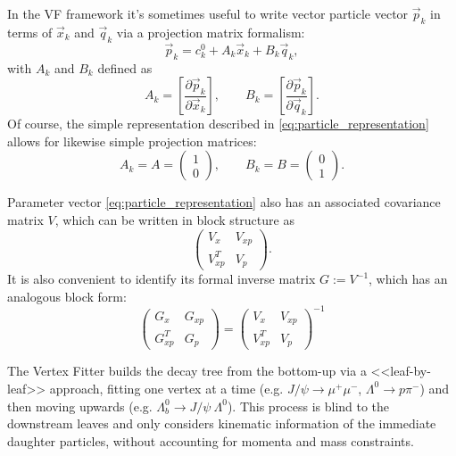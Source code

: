 In the VF framework it's sometimes useful to write vector particle vector $\vec{p}_k$ in terms of $\vec{x}_k$ and $\vec{q}_k$ via a projection matrix formalism:
\begin{equation}
	\vec{p}_k = c^0_k + A_k \vec{x}_k + B_k \vec{q}_k,
\end{equation}
with $A_k$ and $B_k$ defined as
\begin{equation}
A_k = \left[
	\frac{\partial \vec{p}_k}{\partial \vec{x}_k}
\right],
\quad\quad 
B_k = \left[
	\frac{\partial \vec{p}_k}{\partial \vec{q}_k}
\right].
\end{equation}
Of course, the simple representation described in \eqref{eq:particle_representation} allows for likewise simple projection matrices:
\begin{equation}
A_k = A = \begin{pmatrix}
1 \\
0
\end{pmatrix},
\quad\quad 
B_k = B = \begin{pmatrix}
0 \\
1
\end{pmatrix}.
\end{equation}

Parameter vector \eqref{eq:particle_representation} also has an associated covariance matrix $V$, which can be written in block structure as
\begin{equation}
	\begin{pmatrix}
		V_x      & V_{xp} \\
		V_{xp}^T & V_p
	\end{pmatrix}.
\end{equation}
It is also convenient to identify its formal inverse matrix $G := V^{-1}$, which has an analogous block form:
\begin{equation}
	\begin{pmatrix}
		G_x      & G_{xp} \\
		G_{xp}^T & G_p
	\end{pmatrix}
	=
	\begin{pmatrix}
		V_x      & V_{xp} \\
		V_{xp}^T & V_p
	\end{pmatrix}^{-1}
\end{equation}

The Vertex Fitter builds the decay tree from the bottom-up via a <<leaf-by-leaf>> approach, fitting one vertex at a time (e.g. $J/\psi \rightarrow \mu^+ \mu^-$, $\Lambda^0 \rightarrow p \pi^-$) and then moving upwards (e.g. $\Lambda_b^0 \rightarrow J/\psi~\Lambda^0$).
This process is blind to the downstream leaves and only considers kinematic information of the immediate daughter particles, without accounting for momenta and mass constraints.

